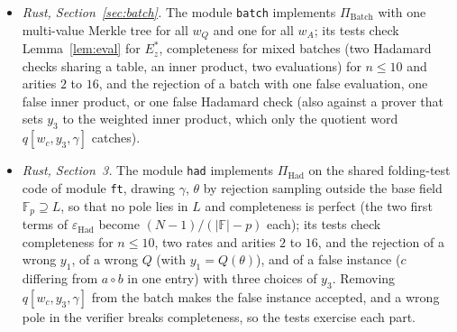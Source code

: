 \documentclass[11pt]{article}
\theoremstyle{definition}
\newcommand{\F}{\mathbb{F}}
\begin{document}
\begin{itemize}[nosep]
The closed forms of the public tables, file \texttt{PublicTables.lean}: $V_{\mathbf 1}=\prod_k(1+X^{2^k})$ (\texttt{kronEnc\_one}), $V_{G_\eta}(x)=V_{\mathbf 1}(\eta x)$ (\texttt{eval\_kronEnc\_geo}), $V_{\mathrm{id}}=XV_{\mathbf 1}'$ (\texttt{kronEnc\_id}), and the recursion $S_k,T_k$ used by the verifier (\texttt{kronEnc\_one\_eq\_recS}, \texttt{kronEnc\_id\_eq\_recT}).
\item \emph{Rust, Section~\ref{sec:batch}.} The module \texttt{batch} implements $\Pi_{\mathrm{Batch}}$ with one multi-value Merkle tree for all $w_Q$ and one for all $w_A$; its tests check Lemma~\ref{lem:eval} for $E^\ast_z$, completeness for mixed batches (two Hadamard checks sharing a table, an inner product, two evaluations) for $n\le10$ and arities $2$ to $16$, and the rejection of a batch with one false evaluation, one false inner product, or one false Hadamard check (also against a prover that sets $y_3$ to the weighted inner product, which only the quotient word $q[w_c,y_3,\gamma]$ catches).
\item \emph{Rust, Section~3.} The module \texttt{had} implements $\Pi_{\mathrm{Had}}$ on the shared folding-test code of module \texttt{ft}, drawing $\gamma$, $\theta$ by rejection sampling outside the base field $\F_p\supseteq L$, so that no pole lies in $L$ and completeness is perfect (the two first terms of $\varepsilon_{\mathrm{Had}}$ become $(N-1)/(|\F|-p)$ each); its tests check completeness for $n\le10$, two rates and arities $2$ to $16$, and the rejection of a wrong $y_1$, of a wrong $Q$ (with $y_1=Q(\theta)$), and of a false instance ($c$ differing from $a\circ b$ in one entry) with three choices of $y_3$. Removing $q[w_c,y_3,\gamma]$ from the batch makes the false instance accepted, and a wrong pole in the verifier breaks completeness, so the tests exercise each part.
\end{itemize}
\end{document}

